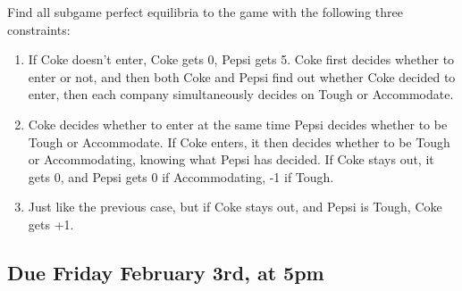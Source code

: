 \documentclass[
  11pt,
]{article}
\providecommand{\tightlist}{%
  \setlength{\itemsep}{0pt}\setlength{\parskip}{0pt}}
\begin{document}
Find all subgame perfect equilibria to the game with the following three
constraints:

\begin{enumerate}
\def\labelenumi{\arabic{enumi}.}
\tightlist
\item
  If Coke doesn't enter, Coke gets 0, Pepsi gets 5. Coke first decides
  whether to enter or not, and then both Coke and Pepsi find out whether
  Coke decided to enter, then each company simultaneously decides on
  Tough or Accommodate.
\item
  Coke decides whether to enter at the same time Pepsi decides whether
  to be Tough or Accommodate. If Coke enters, it then decides whether to
  be Tough or Accommodating, knowing what Pepsi has decided. If Coke
  stays out, it gets 0, and Pepsi gets 0 if Accommodating, -1 if Tough.
\item
  Just like the previous case, but if Coke stays out, and Pepsi is
  Tough, Coke gets +1.
\end{enumerate}

\hypertarget{due-friday-february-3rd-at-5pm}{%
\subsection{Due Friday February 3rd, at
5pm}\label{due-friday-february-3rd-at-5pm}}
\end{document}
